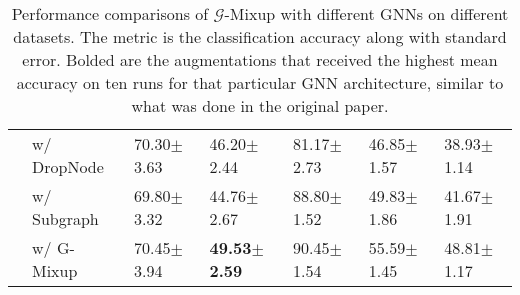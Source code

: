 \begin{table}[H]
\begin{tabular}{ccccccc}
                     & \multicolumn{1}{l}{w/ DropNode} & \multicolumn{1}{l}{70.30$\pm$3.63} & \multicolumn{1}{l}{46.20$\pm$2.44}          & \multicolumn{1}{l}{81.17$\pm$2.73} & \multicolumn{1}{l}{46.85$\pm$1.57} & \multicolumn{1}{l}{38.93$\pm$1.14} \\
                     & \multicolumn{1}{l}{w/ Subgraph} & \multicolumn{1}{l}{69.80$\pm$3.32} & \multicolumn{1}{l}{44.76$\pm$2.67}          & \multicolumn{1}{l}{88.80$\pm$1.52} & \multicolumn{1}{l}{49.83$\pm$1.86} & \multicolumn{1}{l}{41.67$\pm$1.91} \\
                     & \multicolumn{1}{l}{w/ G-Mixup}  & \multicolumn{1}{l}{70.45$\pm$3.94} & \multicolumn{1}{l}{\textbf{49.53}$\pm$\textbf{2.59}} & \multicolumn{1}{l}{90.45$\pm$1.54} & \multicolumn{1}{l}{55.59$\pm$1.45} & \multicolumn{1}{l}{48.81$\pm$1.17} \\ \hline
\end{tabular}
\caption{Performance comparisons of $\mathcal{G}$-Mixup with different GNNs on different datasets. The metric is the classification accuracy along with standard error. Bolded are the augmentations that received the highest mean accuracy on ten runs for that particular GNN architecture, similar to what was done in the original paper.}
\label{tableexp3}
\end{table}

